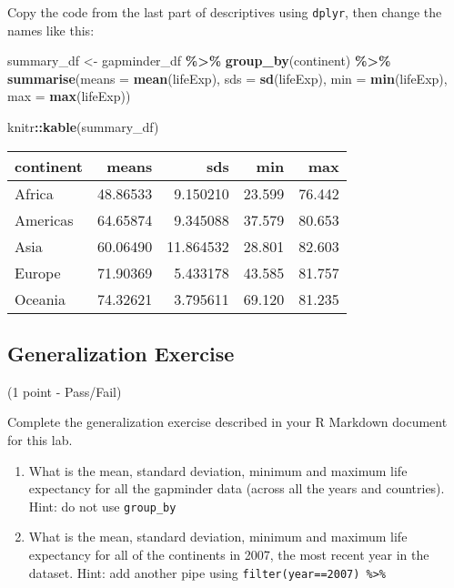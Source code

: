 \documentclass[
]{book}
\newenvironment{Shaded}{\begin{snugshade}}{\end{snugshade}}
\newcommand{\AttributeTok}[1]{\textcolor[rgb]{0.13,0.29,0.53}{#1}}
\newcommand{\FunctionTok}[1]{\textcolor[rgb]{0.13,0.29,0.53}{\textbf{#1}}}
\newcommand{\NormalTok}[1]{#1}
\newcommand{\OtherTok}[1]{\textcolor[rgb]{0.56,0.35,0.01}{#1}}
\newcommand{\SpecialCharTok}[1]{\textcolor[rgb]{0.81,0.36,0.00}{\textbf{#1}}}
\begin{document}
Copy the code from the last part of descriptives using \texttt{dplyr}, then change the names like this:

\begin{Shaded}
\begin{Highlighting}[]
\NormalTok{summary\_df }\OtherTok{\textless{}{-}}\NormalTok{ gapminder\_df }\SpecialCharTok{\%\textgreater{}\%}
               \FunctionTok{group\_by}\NormalTok{(continent) }\SpecialCharTok{\%\textgreater{}\%}
               \FunctionTok{summarise}\NormalTok{(}\AttributeTok{means =} \FunctionTok{mean}\NormalTok{(lifeExp),}
                         \AttributeTok{sds =} \FunctionTok{sd}\NormalTok{(lifeExp),}
                         \AttributeTok{min =} \FunctionTok{min}\NormalTok{(lifeExp),}
                         \AttributeTok{max =} \FunctionTok{max}\NormalTok{(lifeExp))}

\NormalTok{knitr}\SpecialCharTok{::}\FunctionTok{kable}\NormalTok{(summary\_df)}
\end{Highlighting}
\end{Shaded}

\begin{tabular}{l|r|r|r|r}
\hline
continent & means & sds & min & max\\
\hline
Africa & 48.86533 & 9.150210 & 23.599 & 76.442\\
\hline
Americas & 64.65874 & 9.345088 & 37.579 & 80.653\\
\hline
Asia & 60.06490 & 11.864532 & 28.801 & 82.603\\
\hline
Europe & 71.90369 & 5.433178 & 43.585 & 81.757\\
\hline
Oceania & 74.32621 & 3.795611 & 69.120 & 81.235\\
\hline
\end{tabular}

\hypertarget{generalization-exercise-1}{%
\subsection{Generalization Exercise}\label{generalization-exercise-1}}

(1 point - Pass/Fail)

Complete the generalization exercise described in your R Markdown document for this lab.

\begin{enumerate}
\def\labelenumi{\arabic{enumi}.}
\item
  What is the mean, standard deviation, minimum and maximum life expectancy for all the gapminder data (across all the years and countries). Hint: do not use \texttt{group\_by}
\item
  What is the mean, standard deviation, minimum and maximum life expectancy for all of the continents in 2007, the most recent year in the dataset. Hint: add another pipe using \texttt{filter(year==2007)\ \%\textgreater{}\%}
\end{enumerate}
\end{document}
